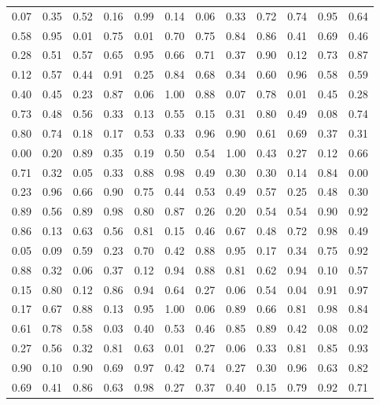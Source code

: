 \begin{center}
\setlength{\tabcolsep}{10pt}
\renewcommand{\arraystretch}{1.25}
\begin{tabular}{llllllllllll}
0.07 & 0.35 & 0.52 & 0.16 & 0.99 & 0.14 & 0.06 & 0.33 & 0.72 & 0.74 & 0.95 & 0.64 \\
0.58 & 0.95 & 0.01 & 0.75 & 0.01 & 0.70 & 0.75 & 0.84 & 0.86 & 0.41 & 0.69 & 0.46 \\
0.28 & 0.51 & 0.57 & 0.65 & 0.95 & 0.66 & 0.71 & 0.37 & 0.90 & 0.12 & 0.73 & 0.87 \\
0.12 & 0.57 & 0.44 & 0.91 & 0.25 & 0.84 & 0.68 & 0.34 & 0.60 & 0.96 & 0.58 & 0.59 \\
0.40 & 0.45 & 0.23 & 0.87 & 0.06 & 1.00 & 0.88 & 0.07 & 0.78 & 0.01 & 0.45 & 0.28 \\
0.73 & 0.48 & 0.56 & 0.33 & 0.13 & 0.55 & 0.15 & 0.31 & 0.80 & 0.49 & 0.08 & 0.74 \\
0.80 & 0.74 & 0.18 & 0.17 & 0.53 & 0.33 & 0.96 & 0.90 & 0.61 & 0.69 & 0.37 & 0.31 \\
0.00 & 0.20 & 0.89 & 0.35 & 0.19 & 0.50 & 0.54 & 1.00 & 0.43 & 0.27 & 0.12 & 0.66 \\
0.71 & 0.32 & 0.05 & 0.33 & 0.88 & 0.98 & 0.49 & 0.30 & 0.30 & 0.14 & 0.84 & 0.00 \\
0.23 & 0.96 & 0.66 & 0.90 & 0.75 & 0.44 & 0.53 & 0.49 & 0.57 & 0.25 & 0.48 & 0.30 \\
0.89 & 0.56 & 0.89 & 0.98 & 0.80 & 0.87 & 0.26 & 0.20 & 0.54 & 0.54 & 0.90 & 0.92 \\
0.86 & 0.13 & 0.63 & 0.56 & 0.81 & 0.15 & 0.46 & 0.67 & 0.48 & 0.72 & 0.98 & 0.49 \\
0.05 & 0.09 & 0.59 & 0.23 & 0.70 & 0.42 & 0.88 & 0.95 & 0.17 & 0.34 & 0.75 & 0.92 \\
0.88 & 0.32 & 0.06 & 0.37 & 0.12 & 0.94 & 0.88 & 0.81 & 0.62 & 0.94 & 0.10 & 0.57 \\
0.15 & 0.80 & 0.12 & 0.86 & 0.94 & 0.64 & 0.27 & 0.06 & 0.54 & 0.04 & 0.91 & 0.97 \\
0.17 & 0.67 & 0.88 & 0.13 & 0.95 & 1.00 & 0.06 & 0.89 & 0.66 & 0.81 & 0.98 & 0.84 \\
0.61 & 0.78 & 0.58 & 0.03 & 0.40 & 0.53 & 0.46 & 0.85 & 0.89 & 0.42 & 0.08 & 0.02 \\
0.27 & 0.56 & 0.32 & 0.81 & 0.63 & 0.01 & 0.27 & 0.06 & 0.33 & 0.81 & 0.85 & 0.93 \\
0.90 & 0.10 & 0.90 & 0.69 & 0.97 & 0.42 & 0.74 & 0.27 & 0.30 & 0.96 & 0.63 & 0.82 \\
0.69 & 0.41 & 0.86 & 0.63 & 0.98 & 0.27 & 0.37 & 0.40 & 0.15 & 0.79 & 0.92 & 0.71 \\

\end{tabular}
\end{center}
